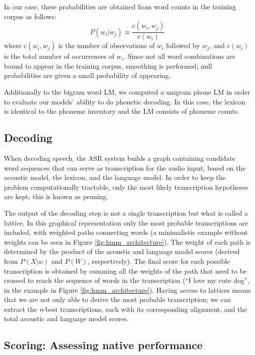 In our case, these probabilities are obtained from word counts in the training corpus as follows:
\begin{equation}
P(w_i | w_j) \approx \frac{c(w_i, w_j)}{c(w_i)}
\end{equation}
where $c(w_i, w_j)$ is the number of observations of $w_i$ followed by $w_j$, and $c(w_i)$ is the total number of occurrences of $w_i$.
Since not all word combinations are bound to appear in the training corpus, smoothing is performed; null probabilities are given a small probability of appearing. 

Additionally to the bigram word LM, we computed a unigram phone LM in order to evaluate our models' ability to do phonetic decoding. In this case, the lexicon is identical to the phoneme inventory and the LM consists of phoneme counts.  

\subsection{Decoding}
When decoding speech, the ASR system builds a graph containing candidate word sequences that can serve as transcription for the audio input, based on the acoustic model, the lexicon, and the language model. In order to keep the problem computationally tractable, only the most likely transcription hypotheses are kept; this is known as pruning.

The output of the decoding step is not a single transcription but what is called a lattice. In this graphical representation only the most probable transcriptions are included, with weighted paths connecting words (a minimalistic example without weights can be seen in Figure \ref{fig:hmm_architecture}). The weight of each path is determined by the product of the acoustic and language model scores (derived from $P(X|w)$ and $P(W)$, respectively). The final score for each possible transcription is obtained by summing all the weights of the path that need to be crossed to reach the sequence of words in the transcription (``I love my cute dog'', in the example in Figure \ref{fig:hmm_architecture}). Having access to lattices means that we are not only able to derive the most probable transcription; we can extract the \textit{n}-best transcriptions, each with its corresponding alignment, and the total acoustic and language model scores.   

\subsection{Scoring: Assessing native performance}

